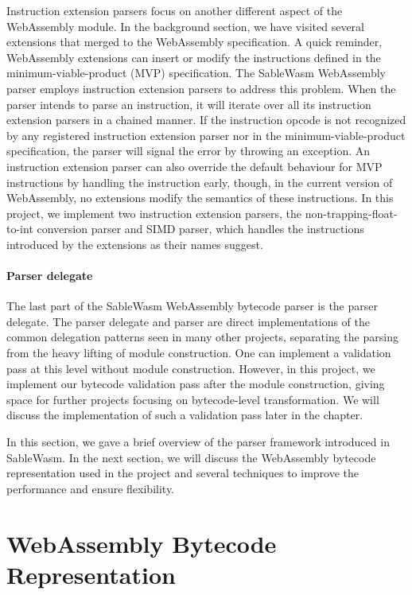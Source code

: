 Instruction extension parsers focus on another different aspect of the
WebAssembly module. In the background section, we have visited several
extensions that merged to the WebAssembly specification. A quick reminder,
WebAssembly extensions can insert or modify the instructions defined in the
minimum-viable-product (MVP) specification. The SableWasm WebAssembly parser
employs instruction extension parsers to address this problem. When the parser
intends to parse an instruction, it will iterate over all its instruction
extension parsers in a chained manner. If the instruction opcode is not
recognized by any registered instruction extension parser nor in the
minimum-viable-product specification, the parser will signal the error by
throwing an exception. An instruction extension parser can also override the
default behaviour for MVP instructions by handling the instruction early,
though, in the current version of WebAssembly, no extensions modify the
semantics of these instructions. In this project, we implement two instruction
extension parsers, the non-trapping-float-to-int conversion parser and SIMD
parser, which handles the instructions introduced by the extensions as their
names suggest.

\paragraph{Parser delegate}
The last part of the SableWasm WebAssembly bytecode parser is the parser
delegate. The parser delegate and parser are direct implementations of the
common delegation patterns seen in many other projects, separating the parsing
from the heavy lifting of module construction. One can implement a validation
pass at this level without module construction. However, in this project, we
implement our bytecode validation pass after the module construction, giving
space for further projects focusing on bytecode-level transformation. We will
discuss the implementation of such a validation pass later in the chapter.

In this section, we gave a brief overview of the parser framework introduced in
SableWasm. In the next section, we will discuss the WebAssembly bytecode
representation used in the project and several techniques to improve the
performance and ensure flexibility.

\section{WebAssembly Bytecode Representation}

